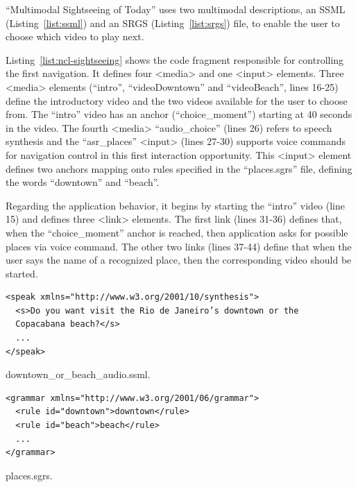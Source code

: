 \documentclass[
  doutorado,
  american
]{ThesisPUC}
\newcommand{\lis}[1]{Listing~\ref{#1}}
\begin{document}
“Multimodal Sightseeing of Today” uses two multimodal descriptions, an SSML 
(\lis{list:ssml}) and an SRGS (\lis{list:srgs}) file, to enable the user to 
choose which video to play next. 

\lis{list:ncl-sightseeing} shows the code fragment responsible for controlling 
the first 
navigation. It defines four <media> and one <input> elements. Three <media> 
elements (“intro”, “videoDowntown” and “videoBeach”, lines 16-25) define the 
introductory video and the two videos available for the user to choose from. 
The “intro” video has an anchor (“choice\_moment”) starting at 40 seconds in 
the 
video. The fourth <media> “audio\_choice” (lines 26) refers to speech synthesis 
and the “asr\_places” <input> (lines 27-30) supports voice commands for 
navigation control in this first interaction opportunity. This <input> element 
defines two anchors mapping onto rules specified in the “places.sgrs” file, 
defining the words “downtown” and “beach”.

Regarding the application behavior, it begins by starting the “intro” video 
(line 15) and defines three <link> elements. The first link (lines 31-36) 
defines that, when the “choice\_moment” anchor is reached, then application 
asks 
for possible places via voice command. The other two links (lines 37-44) define 
that when the user says the name of a recognized place, then the corresponding 
video should be started.

\begin{listing}[!ht]
\begin{verbatim}
<speak xmlns="http://www.w3.org/2001/10/synthesis">
  <s>Do you want visit the Rio de Janeiro’s downtown or the 
  Copacabana beach?</s>
  ...
</speak>
\end{verbatim}
\caption{downtown\_or\_beach\_audio.ssml.}
\label{list:ssml}
\end{listing}

\begin{listing}[!ht]
\begin{verbatim}
<grammar xmlns="http://www.w3.org/2001/06/grammar">
  <rule id="downtown">downtown</rule>
  <rule id="beach">beach</rule>
  ...
</grammar>
\end{verbatim}
\caption{places.sgrs.}
\label{list:srgs}
\end{listing}
\end{document}
